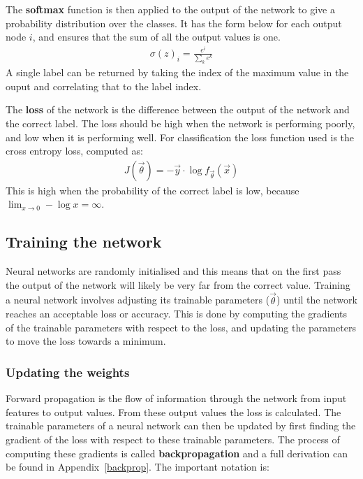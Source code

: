 The \textbf{softmax} function is then applied to the output of the network to give a probability distribution over the classes. It has the 
form below for each output node $i$, and ensures that the sum of all the output values is one.
\begin{align}
  \sigma(z)_{i} = \frac{e^{i}}{\sum_{k} e^{k}}
\end{align}
A single label can be returned by taking the index of the maximum value in the ouput and correlating that to the label index. 

The \textbf{loss} of the network is the difference between the output of the network and the correct label. The loss should be high 
when the network is performing poorly, and low when it is performing well. For classification the loss function used is the cross 
entropy loss, computed as:
\begin{align}
  J(\vec{\theta}) = - \vec{y} \cdot \log{f_{\vec{\theta}}(\vec{x})} \label{eq:ce}
\end{align}
This is high when the probability of the correct label is low, because $\lim_{x \to 0} -\log{x} = \infty$.

\subsection{Training the network} \label{train}

Neural networks are randomly initialised and this means that on the first pass
the output of the network will likely be very far from the correct value. Training a neural network involves adjusting its
trainable parameters ($\vec{\theta}$) until the network reaches an acceptable loss or accuracy. This is done by computing 
the gradients of the trainable parameters with respect to the loss, and updating the parameters to move the loss towards 
a minimum.

\subsubsection{Updating the weights}

Forward propagation is the flow of information through the network from input features to output values. From these output values the loss is calculated. 
The trainable parameters of a neural network can then be updated by first finding the gradient of the loss with respect to these trainable parameters.
The process of computing these gradients is called \textbf{backpropagation} and a full derivation can be found in Appendix~\ref{backprop}. The important notation is:


